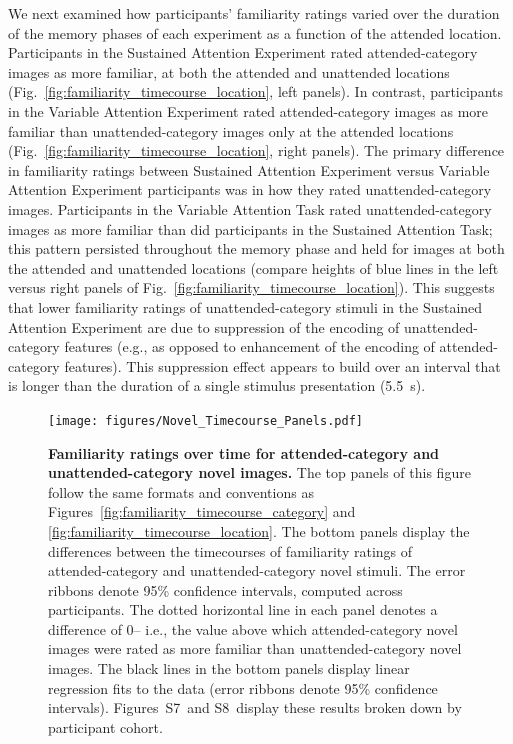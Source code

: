 \documentclass[english]{article}
\newcommand{\timecourseNovel}{S7}
\newcommand{\timecourseDiff}{S8}
\begin{document}
We next examined how participants' familiarity ratings varied over the duration
of the memory phases of each experiment as a function of the attended location.
Participants in the Sustained Attention Experiment rated attended-category
images as more familiar, at both the attended and unattended locations
(Fig.~\ref{fig:familiarity_timecourse_location}, left panels). In contrast,
participants in the Variable Attention Experiment rated attended-category
images as more familiar than unattended-category images only at the attended
locations (Fig.~\ref{fig:familiarity_timecourse_location}, right panels). The
primary difference in familiarity ratings between Sustained Attention
Experiment versus Variable Attention Experiment participants was in how they
rated unattended-category images. Participants in the Variable Attention Task
rated unattended-category images as more familiar than did participants in the
Sustained Attention Task; this pattern persisted throughout the memory phase
and held for images at both the attended and unattended locations (compare
heights of blue lines in the left versus right panels of
Fig.~\ref{fig:familiarity_timecourse_location}). This suggests that lower
familiarity ratings of unattended-category stimuli in the Sustained Attention
Experiment are due to suppression of the encoding of unattended-category
features (e.g., as opposed to enhancement of the encoding of attended-category
features). This suppression effect appears to build over an interval that is
longer than the duration of a single stimulus presentation (5.5~s).

\begin{figure}[tp]
  \centering
  \texttt{[image: figures/Novel\_Timecourse\_Panels.pdf]}

  \caption{\textbf{Familiarity ratings over time for attended-category and
  unattended-category novel images.} The top panels of this figure follow the
  same formats and conventions as
  Figures~\ref{fig:familiarity_timecourse_category} and
  \ref{fig:familiarity_timecourse_location}. The bottom panels display the
  differences between the timecourses of familiarity ratings of
  attended-category and unattended-category novel stimuli. The error ribbons
  denote 95\% confidence intervals, computed across participants. The dotted
  horizontal line in each panel denotes a difference of 0-- i.e., the value
  above which attended-category novel images were rated as more familiar than
  unattended-category novel images. The black lines in the bottom panels
  display linear regression fits to the data (error ribbons denote 95\%
  confidence intervals). Figures~\timecourseNovel~and \timecourseDiff~display
  these results broken down by participant cohort.}

\label{fig:familiarity_timecourse_novel}
\end{figure}
\end{document}

